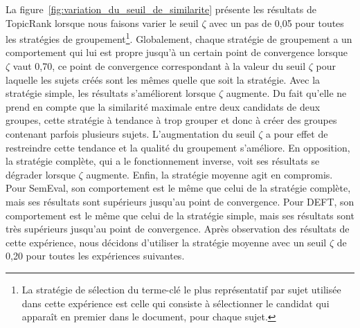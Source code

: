     La figure~\ref{fig:variation_du_seuil_de_similarite} présente les résultats
    de TopicRank lorsque nous faisons varier le seuil $\zeta$ avec un pas de
    0,05 pour toutes les stratégies de groupement\footnote{La stratégie de
    sélection du terme-clé le plus représentatif par sujet utilisée dans cette
    expérience est celle qui consiste à sélectionner le candidat qui apparaît en
    premier dans le document, pour chaque sujet.}.
    Globalement, chaque stratégie de groupement a un comportement qui lui est
    propre jusqu'à un certain point de convergence lorsque $\zeta$ vaut 0,70, ce
    point de convergence correspondant à la valeur du seuil $\zeta$ pour
    laquelle les sujets créés sont les mêmes quelle que soit la stratégie. Avec
    la stratégie simple, les résultats s'améliorent lorsque $\zeta$
    augmente. Du fait qu'elle ne prend en compte que la similarité maximale
    entre deux candidats de deux groupes, cette stratégie à tendance à trop
    grouper et donc à créer des groupes contenant parfois plusieurs sujets.
    L'augmentation du seuil $\zeta$ a pour effet de restreindre cette tendance
    et la qualité du groupement s'améliore. En opposition, la stratégie
    complète, qui a le fonctionnement inverse, voit ses résultats se dégrader
    lorsque $\zeta$ augmente. Enfin, la stratégie moyenne agit en compromis.
    Pour SemEval, son comportement est le même que celui de la stratégie
    complète, mais ses résultats sont supérieurs jusqu'au point de convergence.
    Pour DEFT, son comportement est le même que celui de la stratégie simple,
    mais ses résultats sont très supérieurs jusqu'au point de convergence.
    Après observation des résultats de cette expérience, nous décidons
    d'utiliser la stratégie moyenne avec un seuil $\zeta$ de 0,20 pour toutes
    les expériences suivantes.

